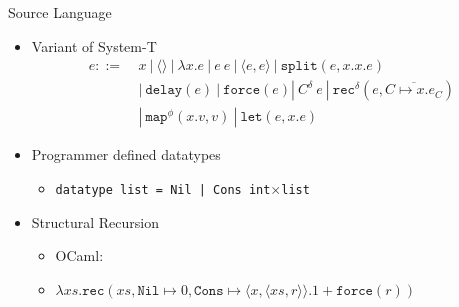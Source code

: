 \documentclass[pdf]{beamer}
\newcommand{\T}[1]{\texttt{#1}}
\newcommand{\LP}{\langle}
\newcommand{\RP}{\rangle}
\begin{document}
\begin{frame}{Source Language}
  \begin{itemize}
    \item Variant of System-T
      \begin{align*}
        e ::=\ &x\ |\ \LP\RP\ |\ \lambda x.e\ |\ e\ e\ |\ \LP e,e\RP\ |\ \T{split}(e, x.x.e) \\
               &|\ \T{delay}(e)\ |\ \T{force}(e)|\ C^\delta\ e\ |\ \T{rec}^\delta(e, \overline{C \mapsto x.e_C}) \\
               &|\ \T{map}^\phi(x.v, v)\ |\ \T{let}(e, x.e)
      \end{align*}
    \vfill
    \item Programmer defined datatypes
      \begin{itemize}
        \item \T{datatype list = Nil | Cons int$\times$list}
      \end{itemize}
    \vfill
    \item Structural Recursion
      \begin{itemize}
        \item OCaml: \lstlength
        \item $\lambda xs.\T{rec}(xs, \T{Nil}\mapsto 0, \T{Cons}\mapsto\LP x,\LP xs,r\RP\RP.1 + \T{force}(r))$
      \end{itemize}
    \vfill
  \end{itemize}
\end{frame}
\end{document}

